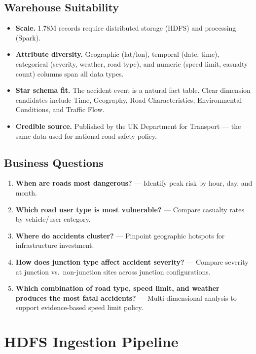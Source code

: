 \documentclass[12pt, a4paper]{article}
\begin{document}
\subsection{Warehouse Suitability}

\begin{itemize}
  \item \textbf{Scale.} 1.78M records require distributed storage (HDFS) and processing (Spark).
  \item \textbf{Attribute diversity.} Geographic (lat/lon), temporal (date, time), categorical (severity, weather, road type), and numeric (speed limit, casualty count) columns span all data types.
  \item \textbf{Star schema fit.} The accident event is a natural fact table. Clear dimension candidates include Time, Geography, Road Characteristics, Environmental Conditions, and Traffic Flow.
  \item \textbf{Credible source.} Published by the UK Department for Transport — the same data used for national road safety policy.
\end{itemize}

\subsection{Business Questions}

\begin{enumerate}[label=\textbf{BQ\arabic*.}]
  \item \textbf{When are roads most dangerous?} — Identify peak risk by hour, day, and month.
  \item \textbf{Which road user type is most vulnerable?} — Compare casualty rates by vehicle/user category.
  \item \textbf{Where do accidents cluster?} — Pinpoint geographic hotspots for infrastructure investment.
  \item \textbf{How does junction type affect accident severity?} — Compare severity at junction vs.\ non-junction sites across junction configurations.
  \item \textbf{Which combination of road type, speed limit, and weather produces the most fatal accidents?} — Multi-dimensional analysis to support evidence-based speed limit policy.
\end{enumerate}


\section{HDFS Ingestion Pipeline}
\end{document}
